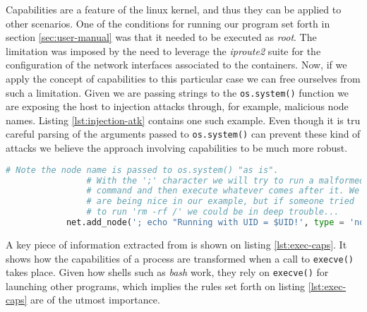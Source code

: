         Capabilities are a feature of the linux kernel, and thus they can be applied to other scenarios. One of the conditions for running our program set forth in section \ref{sec:user-manual} was that it needed to be executed as \textit{root}. The limitation was imposed by the need to leverage the \textit{iproute2} suite for the configuration of the network interfaces associated to the containers. Now, if we apply the concept of capabilities to this particular case we can free ourselves from such a limitation. Given we are passing strings to the \texttt{os.system()} function we are exposing the host to injection attacks through, for example, malicious node names. Listing \ref{lst:injection-atk} contains one such example. Even though it is tru careful parsing of the arguments passed to \texttt{os.system()} can prevent these kind of attacks we believe the approach involving capabilities to be much more robust.\\

        \begin{lstlisting}[language = python, caption = A malicious node name exploiting privileges., label = lst:injection-atk]
            # Note the node name is passed to os.system() "as is".
                # With the ';' character we will try to run a malformed
                # command and then execute whatever comes after it. We
                # are being nice in our example, but if someone tried
                # to run 'rm -rf /' we could be in deep trouble...
            net.add_node('; echo "Running with UID = $UID!', type = 'node')
        \end{lstlisting}

        A key piece of information extracted from \cite{bib:man-capabilities} is shown on listing \ref{lst:exec-caps}. It shows how the capabilities of a process are transformed when a call to \texttt{execve()} \cite{bib:man-execve} takes place. Given how shells such as \textit{bash} \cite{bib:man-bash} work, they rely on \texttt{execve()} for launching other programs, which implies the rules set forth on listing \ref{lst:exec-caps} are of the utmost importance.\\

